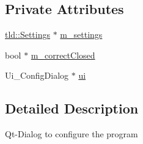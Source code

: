 \subsection*{Private Attributes}
\begin{DoxyCompactItemize}
\item 
\hyperlink{classtld_1_1Settings}{tld\-::\-Settings} $\ast$ \hyperlink{classConfigDialog_aebf816c83d7aa4a3bff2b3e1e16ccb6d}{m\-\_\-settings}
\item 
bool $\ast$ \hyperlink{classConfigDialog_a49a00b0b82e40c2e26ddb3702438f3ff}{m\-\_\-correct\-Closed}
\item 
Ui\-\_\-\-Config\-Dialog $\ast$ \hyperlink{classConfigDialog_a0f0ed746b2d7583be3869a363b91136c}{ui}
\end{DoxyCompactItemize}


\subsection{Detailed Description}
Qt-\/\-Dialog to configure the program 

